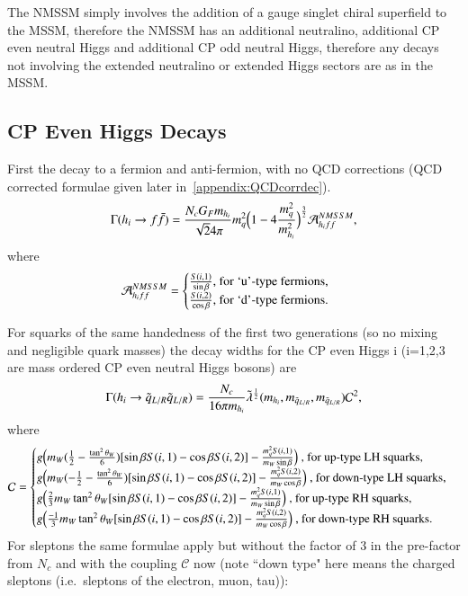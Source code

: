 \documentclass[final,3p,times,pdflatex]{elsarticle}
\begin{document}
The NMSSM simply involves the addition of a gauge singlet chiral superfield to the MSSM, therefore the NMSSM has an additional neutralino, additional CP even neutral Higgs and additional CP odd neutral Higgs, therefore any decays not involving the extended neutralino or extended Higgs sectors are as in the MSSM.

\subsection{CP Even Higgs Decays}

First the decay to a fermion and anti-fermion, with no QCD corrections (QCD corrected formulae given later in~\ref{appendix:QCDcorrdec}).
\begin{equation} \label{hiqqNMSSM}
\Gamma (h_i \rightarrow f \bar{f}) = {N_c G_F m_{h_i} \over \sqrt{2} 4 \pi} m_{q}^2 \Big(1-4{m_{q}^2 \over m_{h_i}^2}\Big)^{3 \over 2} \mathcal{A}_{h_i ff}^{NMSSM},
\end{equation}
where
\begin{equation}
\mathcal{A}_{h_i ff}^{NMSSM} = \begin{cases} {S(i,1) \over \sin\beta} $, for `u'-type fermions, $\\
											 {S(i,2) \over \cos\beta} $, for `d'-type fermions. $\\
								\end{cases}
\end{equation}

For squarks of the same handedness of the first two generations (so no mixing and negligible quark masses) the decay widths for the CP even Higgs i (i=1,2,3 are mass ordered CP even neutral Higgs bosons) are
\begin{equation} \label{hqLRqLRNMSSM}
\Gamma( h_{i} \rightarrow \tilde{q}_{L/R} \tilde{q}_{L/R} ) = {N_{c} \over 16\pi m_{h_i}} \tilde{\lambda}^{1 \over 2}(m_{{h}_i},m_{\tilde{q}_{L/R}},m_{\tilde{q}_{L/R}})\mathcal{C}^2,
\end{equation}
where
\begin{equation}
\mathcal{C} = \begin{cases} g\Big(m_{W}(\frac{1}{2}-{\tan^2 \theta_W \over 6})[\sin\beta S(i,1) - \cos\beta S(i,2)] - {m_{q}^2 S(i,1) \over m_{W} \sin\beta}\Big) $ , for up-type LH squarks,$ \\
							g\Big(m_{W}(-\frac{1}{2}-{\tan^2 \theta_W \over 6})[\sin\beta S(i,1) - \cos\beta S(i,2)] - {m_{q}^2 S(i,2) \over m_{W} \cos\beta}\Big) $ , for down-type LH squarks,$ \\
							g\Big({2 \over 3}m_{W}\tan^2 \theta_W[\sin\beta S(i,1) - \cos\beta S(i,2)] - {m_{q}^2 S(i,1) \over m_{W} \sin\beta}\Big) $ , for up-type RH squarks,$ \\
							g\Big({-1 \over 3}m_{W}\tan^2 \theta_W[\sin\beta S(i,1) - \cos\beta S(i,2)] - {m_{q}^2 S(i,2) \over m_{W} \cos\beta}\Big) $ , for down-type RH squarks$. \\
							\end{cases}
\end{equation}
For sleptons the same formulae apply but without the factor of 3 in the pre-factor from $N_{c}$ and with the coupling $\mathcal{C}$ now (note ``down type" here means the charged sleptons (i.e.\ sleptons of the electron, muon, tau)):
\end{document}
